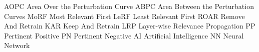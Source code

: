 
 {AOPC} {Area Over the Perturbation Curve}
 {ABPC} {Area Between the Perturbation Curves}
 {MoRF} {Most Relevant First}
 {LeRF} {Least Relevant First}
 {ROAR} {Remove And Retrain}
 {KAR} {Keep And Retrain}
 {LRP} {Layer-wise Relevance Propagation}
 {PP} {Pertinent Positive}
 {PN} {Pertinent Negative}
 {AI} {Artificial Intelligence}
 {NN} {Neural Network}






